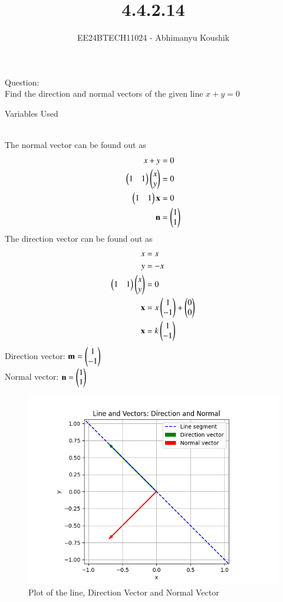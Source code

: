 \documentclass[journal]{IEEEtran}
\begin{document}

\vspace{3cm}

\title{4.4.2.14}
\author{EE24BTECH11024 - Abhimanyu Koushik}
{\let\newpage\relax\maketitle}
Question:\\
Find the direction and normal vectors of the given line $x+y=0$
\begin{table}[h!]    
  \centering
  
  \caption{Variables Used}
  \label{tab1-1.9-6}
\end{table}\\
\solution
The normal vector can be found out as
\begin{align}
x+y&=0\\
\begin{pmatrix}1 & 1\end{pmatrix}\begin{pmatrix}x\\y\end{pmatrix}&=0\\
\begin{pmatrix}1&1\end{pmatrix}\mathbf{x}&=0\\
\mathbf{n}&=\begin{pmatrix}1\\1\end{pmatrix}
\end{align}
The direction vector can be found out as
\begin{align}
x&=x\\
y&=-x\\
\begin{pmatrix}1 & 1\end{pmatrix}\begin{pmatrix}x\\y\end{pmatrix}&=0\\
\mathbf{x}&=x\begin{pmatrix}1\\-1\end{pmatrix}+\begin{pmatrix}0\\0\end{pmatrix}\\
\mathbf{x}&=k\begin{pmatrix}1\\-1\end{pmatrix}
\end{align}
Direction vector: $\mathbf{m}=\begin{pmatrix}1\\-1\end{pmatrix}$\\
Normal vector: $\mathbf{n}=\begin{pmatrix}1\\1\end{pmatrix}$
\begin{figure}[h!]
   \centering
   \includegraphics[width = 1\linewidth]{figs/fig.png}
   \caption{Plot of the line, Direction Vector and Normal Vector}
   \label{stemplot}
\end{figure}
\end{document}
